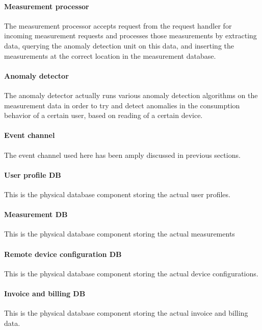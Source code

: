 \paragraph{Measurement processor} 
The measurement processor accepts request from the request handler for incoming measurement requests and processes those measurements by extracting data, querying the anomaly detection unit on this data, and inserting the measurements at the correct location in the measurement database.
\paragraph{Anomaly detector} 
The anomaly detector actually runs various anomaly detection algorithms on the measurement data in order to try and detect anomalies in the consumption behavior of a certain user, based on reading of a certain device.
\paragraph{Event channel}
The event channel used here has been amply discussed in previous sections.
\paragraph{User profile DB} 
This is the physical database component storing the actual user profiles.
\paragraph{Measurement DB} 
This is the physical database component storing the actual measurements
\paragraph{Remote device configuration DB} 
This is the physical database component storing the actual device configurations.
\paragraph{Invoice and billing DB}  
This is the physical database component storing the actual invoice and billing data.

